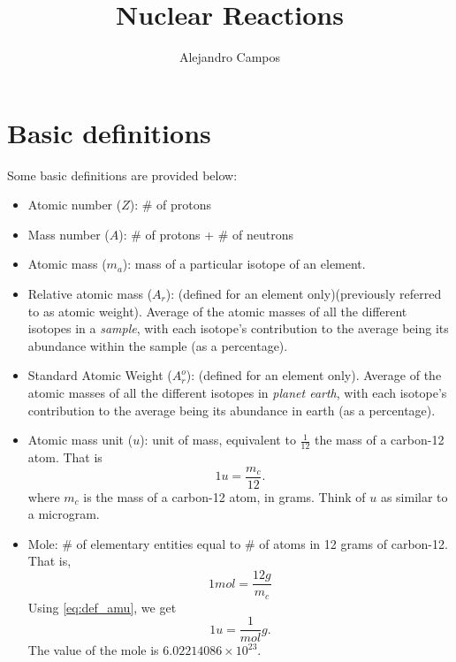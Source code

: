 \documentclass[a4paper,11pt]{article}
\title{Nuclear Reactions}
\author{Alejandro Campos}
\begin{document}
\maketitle
\tableofcontents

\section{Basic definitions}
Some basic definitions are provided below:

\begin{itemize}

\item Atomic number ($Z$): \# of protons

\item Mass number ($A$): \# of protons + \# of neutrons

\item Atomic mass ($m_a$): mass of a particular isotope of an element.

\item Relative atomic mass ($A_r$): (defined for an element only)(previously referred to as atomic weight). Average of the atomic masses of all the different isotopes in a \textit{sample}, with each isotope's contribution to the average being its abundance within the sample (as a percentage).

\item Standard Atomic Weight ($A_r^o$): (defined for an element only). Average of the atomic masses of all the different isotopes in \textit{planet earth}, with each isotope's contribution to the average being its abundance in earth (as a percentage).

\item Atomic mass unit ($u$): unit of mass, equivalent to $\frac{1}{12}$ the mass of a carbon-12 atom. That is 
\begin{equation}
\label{eq:def_amu}
1u = \frac{m_c}{12}.
\end{equation}
where $m_c$ is the mass of a carbon-12 atom, in grams. Think of $u$ as similar to a microgram.

\item Mole: \# of elementary entities equal to \# of atoms in 12 grams of carbon-12. That is,
\begin{equation}
1 mol = \frac{12g}{m_c}
\end{equation}
Using \cref{eq:def_amu}, we get
\begin{equation}
\label{eq:u_g_mol}
1u = \frac{1}{mol} g.
\end{equation}
The value of the mole is $6.02214086 \times 10^{23}$.


\end{itemize}
\end{document}
